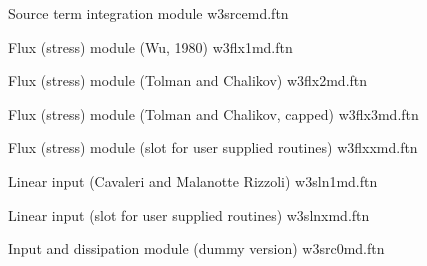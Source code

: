 \vspace{\baselineskip} \noindent
Source term integration module \hfill {\file w3srcemd.ftn}

\begin{flisti}
\end{flisti}

\noindent
Flux (stress) module (Wu, 1980) \hfill {\file w3flx1md.ftn}

\begin{flisti}
\end{flisti}

\noindent
Flux (stress) module (Tolman and Chalikov) \hfill {\file w3flx2md.ftn}

\begin{flisti}
\end{flisti}

\noindent
Flux (stress) module (Tolman and Chalikov, capped) \hfill {\file w3flx3md.ftn}

\begin{flisti}
\end{flisti}

\noindent
Flux (stress) module (slot for user supplied routines) \hfill {\file
w3flxxmd.ftn}

\begin{flisti}
\end{flisti}

\noindent
Linear input (Cavaleri and Malanotte Rizzoli) \hfill {\file w3sln1md.ftn}

\begin{flisti}
\end{flisti}

\noindent
Linear input (slot for user supplied routines) \hfill {\file w3slnxmd.ftn}

\begin{flisti}
\end{flisti}

\noindent
Input and dissipation module (dummy version) \hfill {\file w3src0md.ftn}

\begin{flisti}
\end{flisti}

